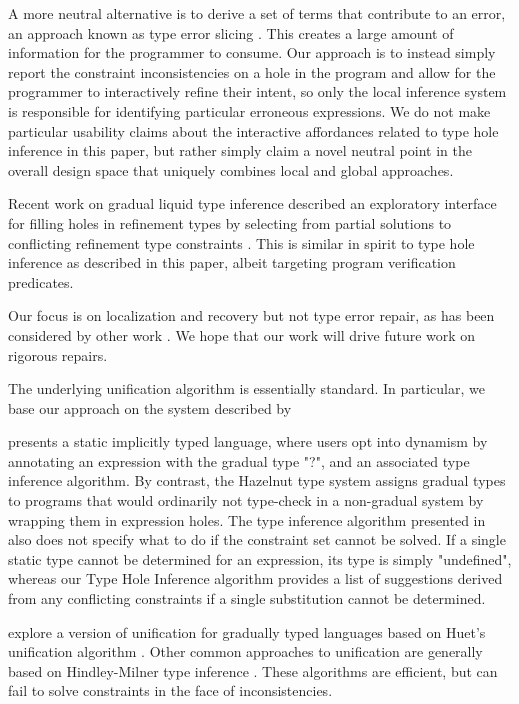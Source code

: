 A more neutral alternative is to derive a set of terms that contribute to an error, an approach known as type error slicing \cite{DBLP:conf/esop/HaackW03,DBLP:journals/tosem/TipD01,DBLP:conf/sfp/Schilling11}. This creates a large amount of information for the programmer to consume. Our approach is to instead simply report the constraint inconsistencies on a hole in the program and allow for the programmer to interactively refine their intent, so only the local inference system is responsible for identifying particular erroneous expressions. We do not make particular usability claims about the interactive affordances related to type hole inference in this paper, but rather simply claim a novel neutral point in the overall design space that uniquely combines local and global approaches. 

Recent work on gradual liquid type inference described an exploratory interface for filling holes in refinement types by selecting from partial solutions to conflicting refinement type constraints \cite{DBLP:journals/pacmpl/VazouTH18}. This is similar in spirit to type hole inference as described in this paper, albeit targeting program verification predicates. 

Our focus is on localization and recovery but not type error repair, as has been considered by other work \cite{lerner07}. We hope that our work will drive future work on rigorous repairs.

The underlying unification algorithm is essentially standard. In particular, we base our approach on the system described by \cite{GradualInfer}

\citet{garcia:2015} presents a static implicitly typed language, where users opt into dynamism by annotating an expression with the gradual type "?", and an associated type inference algorithm. By contrast, the Hazelnut type system assigns gradual types to programs that would ordinarily not type-check in a non-gradual system by wrapping them in expression holes. The type inference algorithm presented in \citet{garcia:2015} also does not specify what to do if the constraint set cannot be solved. If a single static type cannot be determined for an expression, its type is simply "undefined", whereas our Type Hole Inference algorithm provides a list of suggestions derived from any conflicting constraints if a single substitution cannot be determined.

\citet{GradualInfer} explore a version of unification for gradually typed languages based on Huet's unification algorithm \cite{Huet}. Other common approaches to unification are generally based on Hindley-Milner type inference \cite{MilnerInfer}. These algorithms are efficient, but can fail to solve constraints in the face of inconsistencies.

